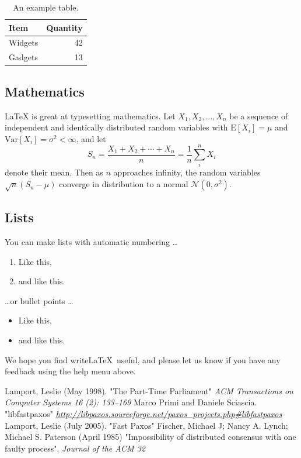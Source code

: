 \begin{table}
\centering
\begin{tabular}{l|r}
Item & Quantity \\\hline
Widgets & 42 \\
Gadgets & 13
\end{tabular}
\caption{\label{tab:widgets}An example table.}
\end{table}

\subsection{Mathematics}

\LaTeX{} is great at typesetting mathematics. Let $X_1, X_2, \ldots, X_n$ be a sequence of independent and identically distributed random variables with $\text{E}[X_i] = \mu$ and $\text{Var}[X_i] = \sigma^2 < \infty$, and let
$$S_n = \frac{X_1 + X_2 + \cdots + X_n}{n}
      = \frac{1}{n}\sum_{i}^{n} X_i$$
denote their mean. Then as $n$ approaches infinity, the random variables $\sqrt{n}(S_n - \mu)$ converge in distribution to a normal $\mathcal{N}(0, \sigma^2)$.

\subsection{Lists}

You can make lists with automatic numbering \dots

\begin{enumerate}
\item Like this,
\item and like this.
\end{enumerate}
\dots or bullet points \dots
\begin{itemize}
\item Like this,
\item and like this.
\end{itemize}

We hope you find write\LaTeX\ useful, and please let us know if you have any feedback using the help menu above.


\begin{thebibliography}{100} 
 Lamport, Leslie (May 1998). "The Part-Time Parliament" \emph{ ACM Transactions on Computer Systems 16 (2): 133–169}
 Marco Primi and Daniele Sciascia. "libfastpaxos" \emph{\url{http://libpaxos.sourceforge.net/paxos_projects.php#libfastpaxos}}
 Lamport, Leslie (July 2005). "Fast Paxos" \emph{}
 Fischer, Michael J; Nancy A. Lynch; Michael S. Paterson (April 1985)  "Impossibility of distributed consensus with one faulty process". \emph{Journal of the ACM 32}
\end{thebibliography} 

